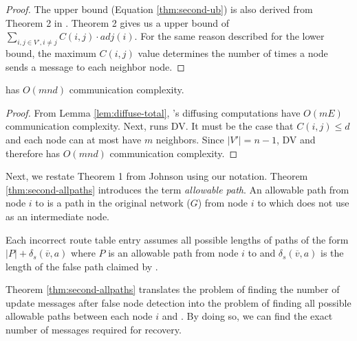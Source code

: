 {{\begin{proof}
The upper bound (Equation \ref{thm:second-ub}) is also derived from Theorem 2 in \cite{Johnson84}.  Theorem 2 gives us a upper bound of 
$\displaystyle \sum_{i,j \in V', i \neq j} C(i,j) \cdot adj(i)$. For the same reason described for the lower bound, the maximum $C(i,j)$ value determines the number of times a node sends a message to each neighbor node.
\end{proof}

\begin{corollary}
\label{cor:second-bigo}
\second has $O(mnd)$ communication complexity.
\end{corollary}
\begin{proof}
From Lemma \ref{lem:diffuse-total}, \seconds's diffusing computations have $O(mE)$ communication complexity. Next, \second runs DV. 
It must be the case that $C(i,j) \leq d$ and each node can at most have $m$ neighbors.  Since $|V'| = n-1$, DV and therefore \second has $O(mnd)$ communication complexity.
\end{proof}

Next, we restate Theorem 1 from Johnson \cite{Johnson84} using our notation.  Theorem \ref{thm:second-allpaths} introduces the term \emph{allowable path}.
An allowable path from node $i$ to \bad is a path in the original network ($G$) from node $i$ to \bad which does not use \bad as an intermediate node.

\begin{theorem}
\label{thm:second-allpaths}
Each incorrect route table entry assumes all possible lengths of paths of the form $|P| + \delta_s(\overline{v},a)$ where $P$ is an allowable path from node $i$ to \bad and 
$\delta_s(\overline{v},a)$ is the length of the false path claimed by \bads.
\end{theorem}

Theorem \ref{thm:second-allpaths} translates the problem of finding the number of update messages after false node detection into the problem of finding all possible 
allowable paths between each node $i$ and \bads.  By doing so, we can find the exact number of messages required for \second recovery.

}}
